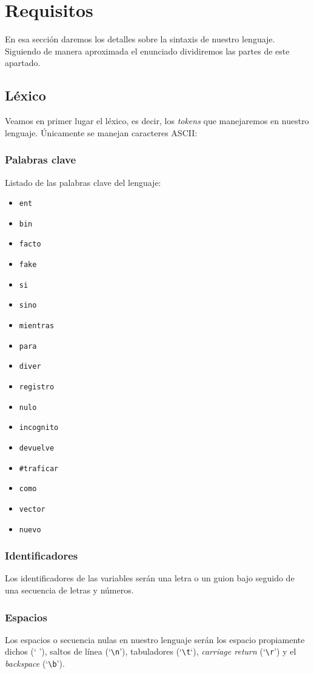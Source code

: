 \section{Requisitos}
En esa sección daremos los detalles sobre la sintaxis de nuestro lenguaje.
Siguiendo de manera aproximada el enunciado dividiremos las partes de este
apartado.

\subsection{Léxico}
Veamos en primer lugar el léxico, es decir, los \textit{tokens} que manejaremos
en nuestro lenguaje. Únicamente se manejan caracteres ASCII:
\subsubsection{Palabras clave}
Listado de las palabras clave del lenguaje:
\begin{itemize}
    \item \lstinline{ent}
    \item \lstinline{bin}
    \item \lstinline{facto}
    \item \lstinline{fake}
    \item \lstinline{si}
    \item \lstinline{sino}
    \item \lstinline{mientras}
    \item \lstinline{para}
    \item \lstinline{diver}
    \item \lstinline{registro}
    \item \lstinline{nulo}
    \item \lstinline{incognito}
    \item \lstinline{devuelve}
    \item \lstinline{#traficar}
    \item \lstinline{como}
    \item \lstinline{vector}
    \item \lstinline{nuevo}
\end{itemize}

\subsubsection{Identificadores}
Los identificadores de las variables serán una letra o un guion bajo seguido de
una secuencia de letras y números.

\subsubsection{Espacios}
Los espacios o secuencia nulas en nuestro lenguaje serán los espacio propiamente
dichos (` '), saltos de línea (`\lstinline{\n}'), tabuladores
(`\lstinline{\t}`), \textit{carriage return} (`\lstinline{\r}') y el
\textit{backspace} (`\lstinline{\b}').

